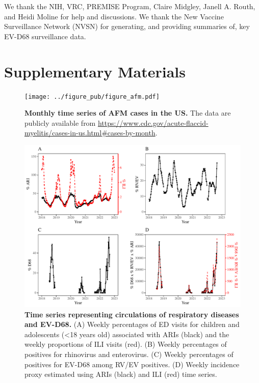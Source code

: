 \documentclass[12pt]{article}
\begin{document}
We thank the NIH, VRC, PREMISE Program, Claire Midgley, Janell A. Routh, and Heidi Moline for help and discussions.
We thank the New Vaccine Surveillance Network (NVSN) for generating, and providing summaries of, key EV-D68 surveillance data.

\pagebreak

\section*{Supplementary Materials}
\setcounter{figure}{0}
\renewcommand{\thefigure}{S\arabic{figure}}

\begin{figure}[!th]
\texttt{[image: ../figure\_pub/figure\_afm.pdf]}
\caption{
\textbf{Monthly time series of AFM cases in the US.}
The data are publicly available from \url{https://www.cdc.gov/acute-flaccid-myelitis/cases-in-us.html\#cases-by-month}.
}
\end{figure}

\pagebreak

\begin{figure}[!th]
\includegraphics[width=\textwidth]{../figure_pub/figure_data_processed_d68.pdf}
\caption{
\textbf{Time series representing circulations of respiratory diseases and EV-D68.}
(A) Weekly percentages of ED visits for children and adolescents (<18 years old) associated with ARIs (black) and the weekly proportions of ILI visits (red).
(B) Weekly percentages of positives for rhinovirus and enterovirus.
(C) Weekly percentages of positives for EV-D68 among RV/EV positives.
(D) Weekly incidence proxy estimated using ARIs (black) and ILI (red) time series.
}
\end{figure}
\end{document}

